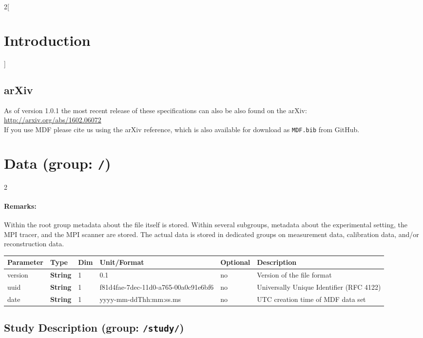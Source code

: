 \documentclass[landscape]{article} %
\newcommand{\inl}[1]{\lstinline[columns=fixed]{#1}}
\newcommand{\inltab}[1]{{\ttfamily\bfseries\color{blue}#1}}
\newcommand{\inlvar}[1]{{\ttfamily#1}}
\begin{document}
\begin{multicols}{2}[\section{Introduction} \label{Sec:Introduction}]
\subsection{arXiv}
As of version 1.0.1 the most recent release of these specifications can also be also found on the arXiv:\\
\hspace*{1cm}\url{http://arxiv.org/abs/1602.06072}\\
If you use MDF please cite us using the arXiv reference, which is also available for download as \texttt{MDF.bib} from GitHub.

\end{multicols}


\section{Data (group: \inl{/})}
 \setlength\extrarowheight{5pt}

\begin{multicols}{2}

\paragraph{Remarks:} Within the root group metadata about the file itself is stored. Within several subgroups, metadata about the experimental setting, the MPI tracer, and the MPI scanner are stored. The actual data is stored in dedicated groups on measurement data, calibration data, and/or reconstruction data.

\end{multicols}


\noindent \begin{tabularx}{\columnwidth}{lllllX} 
\textbf{Parameter} & \textbf{Type} & \textbf{Dim} & \textbf{Unit/Format} & \textbf{Optional} & \textbf{Description} \\ \hline 
\inlvar{version} & \inltab{String} & 1 & 0.1 & no & Version of the file format \\ \hline
\inlvar{uuid} & \inltab{String} & 1 & f81d4fae-7dec-11d0-a765-00a0c91e6bf6 & no & Universally Unique Identifier (RFC 4122) \\ \hline 
\inlvar{date} & \inltab{String} & 1 & yyyy-mm-ddThh:mm:ss.ms & no & UTC creation time of MDF data set \\ \hline
\end{tabularx}


\subsection{Study Description (group: \inl{/study/})}
\end{document}
